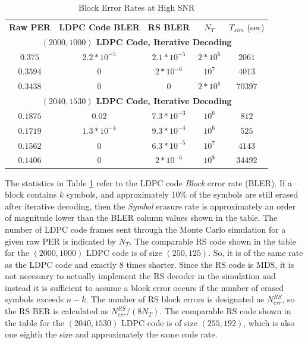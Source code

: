 \documentclass[conference]{IEEEtran}
\begin{document}
\begin{table}[htbp]
\caption{Block Error Rates at High SNR}
\begin{center}
\begin{tabular}{|c|c|c|c|c|}
\hline
\textbf{Raw PER} & \textbf{LDPC Code BLER}& \textbf{RS BLER}& \textbf{$N_T$} &$T_{sim}$ (sec)\\
\cline{1-5} 
\multicolumn{5}{c}{\textbf{$(2000, 1000)$ LDPC Code, Iterative Decoding}} \\
\hline
$0.375$ & $2.2*10^{-5}$ & $2.1*10^{-5}$ & $2*10^6$ & $2061$\\
$0.3594$ & $0$ & $2*10^{-6}$ & $10^7$ & $4013$\\
$0.3438$ & $0$ & $0$ & $2*10^8$ & $70397$ \\
\hline
\multicolumn{5}{c}{\textbf{$(2040, 1530)$ LDPC Code, Iterative Decoding}} \\
\hline
$0.1875$ & $0.02$ & $7.3*10^{-3}$ & $10^6$ & $812$\\
$0.1719$ & $1.3*10^{-4}$ & $9.3*10^{-4}$ & $10^6$ & $525$ \\
$0.1562$ & $0$ & $6.3*10^{-5}$ & $10^7$ & $4143$ \\
$0.1406$ & $0$ & $2*10^{-6}$ & $10^8$ & $34492$ \\
\hline

\end{tabular}
\label{tab:FERHighSNR}
\end{center}
\end{table}

The statistics in Table \ref{tab:FERHighSNR} refer to the LDPC code \textit{Block} error rate (BLER).  If a block contains $k$ symbols, and approximately 10\% of the symbols are still erased after iterative decoding, then the \textit{Symbol} erasure rate is approximately an order of magnitude lower than the BLER column values shown in the table.  The number of LDPC code frames sent through the Monte Carlo simulation for a given raw PER is indicated by $N_T$.  The comparable RS code shown in the table for the $(2000, 1000)$ LDPC code is of size $(250, 125)$.  So, it is of the same rate as the LDPC code and exactly 8 times shorter.  Since the RS code is MDS, it is not necessary to actually implement the RS decoder in the simulation and instead it is sufficient to assume a block error occurs if the number of erased symbols exceeds $n-k$.  The number of RS block errors is designated as $N^{RS}_{err}$, so the RS BER is calculated as ${N^{RS}_{err}}/{(8N_T)}$.  The comparable RS code shown in the table for the $(2040, 1530)$ LDPC code is of size $(255, 192)$, which is also one eighth the size and approximately the same code rate. 
\end{document}
